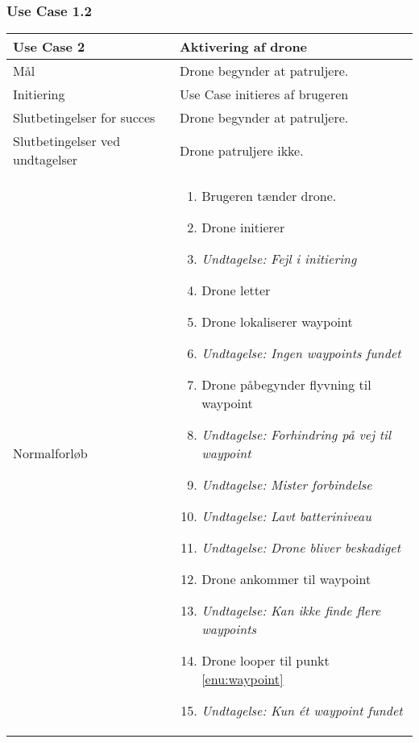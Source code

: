 \documentclass[Main]{subfiles}
\begin{document}
\subsubsection{Use Case 1.2}

\begin{longtable}{|p{}|p{}|}
\hline
Use Case 2 	& Aktivering af drone \\ \hline

Mål 		& Drone begynder at patruljere. \\ \hline

Initiering	& Use Case initieres af brugeren \\ \hline

Slutbetingelser for succes & 
Drone begynder at patruljere.  \\ \hline

Slutbetingelser ved undtagelser & 
Drone patruljere ikke. \\ \hline

Normalforløb &	\vspace{-8mm}
	\begin{enumerate}
	\item Brugeren tænder drone.
	\item Drone initierer
	\item[] \textit{Undtagelse: Fejl i initiering}
	\item Drone letter
	\item \label{enu:waypoint} Drone lokaliserer waypoint 
	\item[] \textit{Undtagelse: Ingen waypoints fundet}
	\item \label{enu:flyvning} Drone påbegynder flyvning til waypoint
	\item[] \textit{Undtagelse: Forhindring på vej til waypoint}
	\item[] \textit{Undtagelse: Mister forbindelse}
	\item[] \textit{Undtagelse: Lavt batteriniveau}
	\item[] \textit{Undtagelse: Drone bliver beskadiget}
	\item Drone ankommer til waypoint
	\item[] \textit{Undtagelse: Kan ikke finde flere waypoints}
	\item Drone looper til punkt \ref{enu:waypoint}
	\item[] \textit{Undtagelse: Kun ét waypoint fundet}
	\end{enumerate} \\ \hline


\end{longtable}
\end{document}
